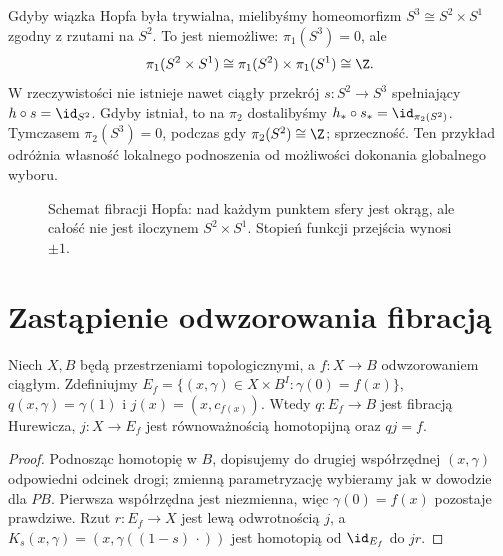 \begin{przyklad}
\label{prz:fib-hopf-nietrywialna}
Gdyby wiązka Hopfa była trywialna, mielibyśmy
homeomorfizm $S^3\cong S^2\times S^1$
zgodny z rzutami na $S^2$. To jest niemożliwe:
$\pi_1(S^3)=0$, ale
\[
 \pi_1(S^2\times S^1)
 \cong\pi_1(S^2)\times\pi_1(S^1)
 \cong\Z.
\]
W rzeczywistości nie istnieje nawet ciągły przekrój
$s:S^2\to S^3$ spełniający $h\circ s=\id_{S^2}$.
Gdyby istniał, to na $\pi_2$ dostalibyśmy
$h_*\circ s_*=\id_{\pi_2(S^2)}$.
Tymczasem $\pi_2(S^3)=0$, podczas gdy
$\pi_2(S^2)\cong\Z$; sprzeczność.
Ten przykład odróżnia własność lokalnego
podnoszenia od możliwości dokonania globalnego wyboru.
\end{przyklad}

\begin{figure}[!htbp]
\centering
{}
\caption{Schemat fibracji Hopfa: nad każdym punktem
sfery jest okrąg, ale całość nie jest iloczynem
$S^2\times S^1$. Stopień funkcji przejścia wynosi $\pm1$.}
\label{fig:fib-hopf}
\end{figure}

\section{Zastąpienie odwzorowania fibracją}
\begin{twierdzenie}
Niech $X,B$ będą przestrzeniami topologicznymi,
a $f:X\to B$ odwzorowaniem ciągłym. Zdefiniujmy
$E_f=\{(x,\gamma)\in X\times B^I:\gamma(0)=f(x)\}$,
$q(x,\gamma)=\gamma(1)$ i $j(x)=(x,c_{f(x)})$.
Wtedy $q:E_f\to B$ jest fibracją Hurewicza,
$j:X\to E_f$ jest równoważnością homotopijną oraz $qj=f$.
\end{twierdzenie}
\begin{proof}
Podnosząc homotopię w $B$, dopisujemy do drugiej współrzędnej
$(x,\gamma)$ odpowiedni odcinek drogi; zmienną parametryzację
wybieramy jak w dowodzie dla $PB$. Pierwsza współrzędna jest
niezmienna, więc $\gamma(0)=f(x)$ pozostaje prawdziwe.
Rzut $r:E_f\to X$ jest lewą odwrotnością $j$,
a $K_s(x,\gamma)=(x,\gamma((1-s)\,\cdot))$ jest
homotopią od $\id_{E_f}$ do $jr$.
\end{proof}

